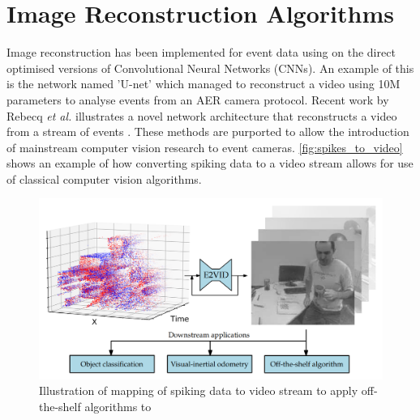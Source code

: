 \section{Image Reconstruction Algorithms}

Image reconstruction has been implemented for event data using on the direct optimised versions of Convolutional Neural Networks (CNNs). An example of this is the network named 'U-net'\cite{UNET} which managed to reconstruct a video using 10M parameters to analyse events from an AER camera protocol. Recent work by Rebecq \textit{et al.} illustrates a novel network architecture that reconstructs a video from a stream of events \cite{spikingToVideo}. These methods are purported to allow the introduction of mainstream computer vision research to event cameras. \autoref{fig:spikes_to_video} shows an example of how converting spiking data to a video stream allows for use of classical computer vision algorithms.

\begin{figure}[htb]
      \centering
      \includegraphics[width=\textwidth]{background/images/spikes_to_video.png}
      \caption{Illustration of mapping of spiking data to video stream to apply off-the-shelf algorithms to\cite{spikingToVideo}}
      \label{fig:spikes_to_video}
\end{figure}

